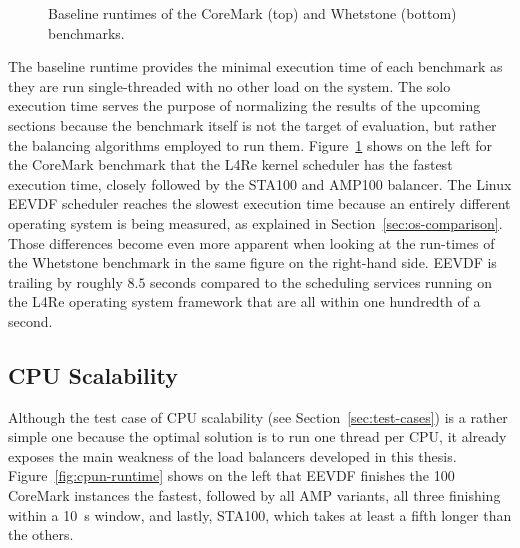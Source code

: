 \begin{figure}[htbp]
	\caption{Baseline runtimes of the CoreMark (top) and Whetstone (bottom) benchmarks.}
\label{fig:baseline-runtime}
\end{figure}

The baseline runtime provides the minimal execution time of each benchmark as they are run single-threaded with no other load on the system.
The solo execution time serves the purpose of normalizing the results of the upcoming sections because the benchmark itself is not the target of evaluation, but rather the balancing algorithms employed to run them.
Figure~\ref{fig:baseline-runtime} shows on the left for the CoreMark benchmark that the L4Re kernel scheduler has the fastest execution time, closely followed by the STA100 and AMP100 balancer.
The Linux EEVDF scheduler reaches the slowest execution time because an entirely different operating system is being measured, as explained in Section~\ref{sec:os-comparison}.
Those differences become even more apparent when looking at the run-times of the Whetstone benchmark in the same figure on the right-hand side.
EEVDF is trailing by roughly $8.5$ seconds compared to the scheduling services running on the L4Re operating system framework that are all within one hundredth of a second.  

\subsection{CPU Scalability}
\label{sec:cpu-scalability}

Although the test case of CPU scalability (see Section~\ref{sec:test-cases}) is a rather simple one because the optimal solution is to run one thread per CPU, it already exposes the main weakness of the load balancers developed in this thesis.
Figure~\ref{fig:cpun-runtime} shows on the left that EEVDF finishes the 100 CoreMark instances the fastest, followed by all AMP variants, all three finishing within a \SI{10}{\second} window, and lastly, STA100, which takes at least a fifth longer than the others.

